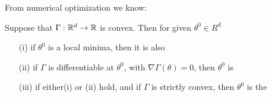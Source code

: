 From numerical optimization we know:
\begin{theorem}\label{thm:29}
    Suppose that \(\Gamma:\mathbb{R}^d\to\mathbb{R}\) is convex. Then for given \(\theta^0\in R^d\)
    \begin{enumerate}
        \item[(i)] if \(\theta^0\) is a local minima, then it is also 
        \item[(ii)] if \(\Gamma\) is differentiable at \(\theta^0\), with \(\nabla\Gamma(\theta)=0\), then \(\theta^0\) is 
        \item[(iii)] if either(i) or (ii) hold, and if \(\Gamma\) is strictly convex, then \(\theta^0\) is the    
    \end{enumerate}
\end{theorem}

